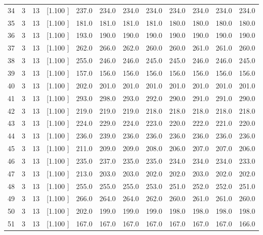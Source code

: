 \documentclass[12pt,a4paper]{article}
\begin{document}
\begin{center}
{\begin{tabular}{r r r r r r r r r r r r}
  34&  3& 13&[1.100     ]&   237.0&   234.0&   234.0&   234.0&   234.0&   234.0&   234.0&   234.0\\[-0.02in]
  35&  3& 13&[1.100     ]&   181.0&   181.0&   181.0&   181.0&   180.0&   180.0&   180.0&   180.0\\[-0.02in]
  36&  3& 13&[1.100     ]&   193.0&   190.0&   190.0&   190.0&   190.0&   190.0&   190.0&   190.0\\[-0.02in]
  37&  3& 13&[1.100     ]&   262.0&   266.0&   262.0&   260.0&   260.0&   261.0&   261.0&   260.0\\[-0.02in]
  38&  3& 13&[1.100     ]&   255.0&   246.0&   246.0&   245.0&   245.0&   246.0&   246.0&   245.0\\[-0.02in]
  39&  3& 13&[1.100     ]&   157.0&   156.0&   156.0&   156.0&   156.0&   156.0&   156.0&   156.0\\[-0.02in]
  40&  3& 13&[1.100     ]&   202.0&   201.0&   201.0&   201.0&   201.0&   201.0&   201.0&   201.0\\[-0.02in]
  41&  3& 13&[1.100     ]&   293.0&   298.0&   293.0&   292.0&   290.0&   291.0&   291.0&   290.0\\[-0.02in]
  42&  3& 13&[1.100     ]&   219.0&   219.0&   219.0&   218.0&   218.0&   218.0&   218.0&   218.0\\[-0.02in]
  43&  3& 13&[1.100     ]&   224.0&   229.0&   224.0&   223.0&   220.0&   222.0&   221.0&   220.0\\[-0.02in]
  44&  3& 13&[1.100     ]&   236.0&   239.0&   236.0&   236.0&   236.0&   236.0&   236.0&   236.0\\[-0.02in]
  45&  3& 13&[1.100     ]&   211.0&   209.0&   209.0&   208.0&   206.0&   207.0&   207.0&   206.0\\[-0.02in]
  46&  3& 13&[1.100     ]&   235.0&   237.0&   235.0&   235.0&   234.0&   234.0&   234.0&   233.0\\[-0.02in]
  47&  3& 13&[1.100     ]&   213.0&   203.0&   203.0&   202.0&   202.0&   203.0&   202.0&   202.0\\[-0.02in]
  48&  3& 13&[1.100     ]&   255.0&   255.0&   255.0&   253.0&   251.0&   252.0&   252.0&   251.0\\[-0.02in]
  49&  3& 13&[1.100     ]&   266.0&   264.0&   264.0&   262.0&   260.0&   261.0&   261.0&   260.0\\[-0.02in]
  50&  3& 13&[1.100     ]&   202.0&   199.0&   199.0&   199.0&   198.0&   198.0&   198.0&   198.0\\[-0.02in]
  51&  3& 13&[1.100     ]&   167.0&   167.0&   167.0&   167.0&   167.0&   167.0&   167.0&   166.0\\[-0.02in]

\end{tabular}}
\end{center}
\end{document}
